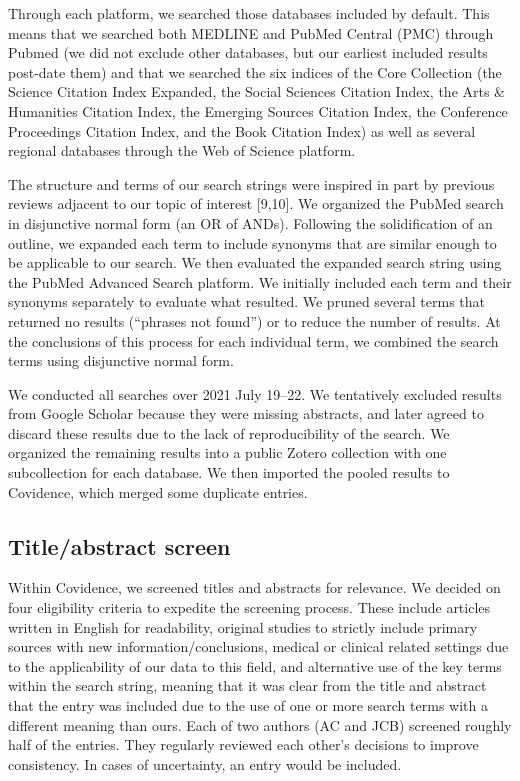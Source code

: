 \documentclass[preprint, 3p,
authoryear]{elsarticle} %
\begin{document}
Through each platform, we searched those databases included by default.
This means that we searched both MEDLINE and PubMed Central (PMC)
through Pubmed (we did not exclude other databases, but our earliest
included results post-date them) and that we searched the six indices of
the Core Collection (the Science Citation Index Expanded, the Social
Sciences Citation Index, the Arts \& Humanities Citation Index, the
Emerging Sources Citation Index, the Conference Proceedings Citation
Index, and the Book Citation Index) as well as several regional
databases through the Web of Science platform.

The structure and terms of our search strings were inspired in part by
previous reviews adjacent to our topic of interest {[}9,10{]}. We
organized the PubMed search in disjunctive normal form (an OR of ANDs).
Following the solidification of an outline, we expanded each term to
include synonyms that are similar enough to be applicable to our search.
We then evaluated the expanded search string using the PubMed Advanced
Search platform. We initially included each term and their synonyms
separately to evaluate what resulted. We pruned several terms that
returned no results (``phrases not found'') or to reduce the number of
results. At the conclusions of this process for each individual term, we
combined the search terms using disjunctive normal form.

We conducted all searches over 2021 July 19--22. We tentatively excluded
results from Google Scholar because they were missing abstracts, and
later agreed to discard these results due to the lack of reproducibility
of the search. We organized the remaining results into a public Zotero
collection with one subcollection for each database. We then imported
the pooled results to Covidence, which merged some duplicate entries.

\hypertarget{titleabstract-screen}{%
\subsection{Title/abstract screen}\label{titleabstract-screen}}

Within Covidence, we screened titles and abstracts for relevance. We
decided on four eligibility criteria to expedite the screening process.
These include articles written in English for readability, original
studies to strictly include primary sources with new
information/conclusions, medical or clinical related settings due to the
applicability of our data to this field, and alternative use of the key
terms within the search string, meaning that it was clear from the title
and abstract that the entry was included due to the use of one or more
search terms with a different meaning than ours. Each of two authors (AC
and JCB) screened roughly half of the entries. They regularly reviewed
each other's decisions to improve consistency. In cases of uncertainty,
an entry would be included.
\end{document}
